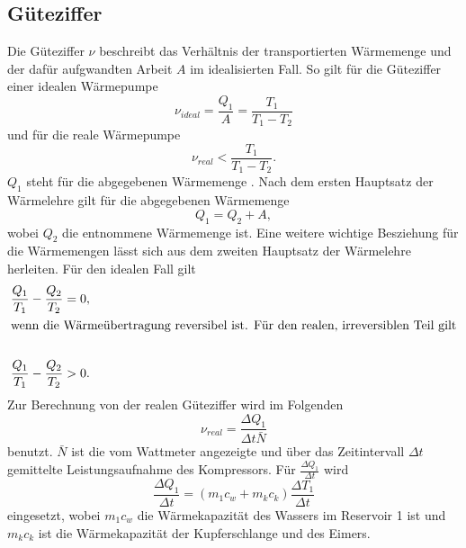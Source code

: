 \subsection{Güteziffer} %
\label{sub:Güteziffer}
Die Güteziffer $\nu$ beschreibt das Verhältnis der transportierten Wärmemenge und der dafür aufgwandten Arbeit $A$ im idealisierten Fall.
So gilt für die Güteziffer einer idealen Wärmepumpe
\begin{equation*}
    \nu_{ideal} = \frac{Q_1}{A} = \frac{T_1}{T_1 - T_2}
    \label{eqn:Güteziffer_ideal}
\end{equation*} 
und für die reale Wärmepumpe
\begin{equation*}
    \nu_{real} < \frac{T_1}{T_1 - T_2}.
\end{equation*}
$Q_1$ steht für die abgegebenen Wärmemenge . 
Nach dem ersten Hauptsatz der Wärmelehre gilt für die abgegebenen Wärmemenge
\begin{equation*}
    Q_1 = Q_2 + A ,
\end{equation*}
wobei $Q_2$  die entnommene Wärmemenge ist.
Eine weitere wichtige Besziehung für die Wärmemengen lässt sich aus dem zweiten Hauptsatz der Wärmelehre herleiten.
Für den idealen Fall gilt
\begin{align*}
    \frac{Q_1}{T_1}-\frac{Q_2}{T_2} = 0,\\
    \intertext{wenn die Wärmeübertragung reversibel ist. Für den realen, irreversiblen Teil gilt}\\
    \frac{Q_1}{T_1}-\frac{Q_2}{T_2} > 0.
\end{align*}
Zur Berechnung von der realen Güteziffer wird im Folgenden 
\begin{equation}
    \nu_{real} = \frac{\Delta Q_1}{\Delta t \bar{N}}
    \label{eqn:Güteziffer}
\end{equation}
benutzt. 
$\bar{N}$ ist die vom Wattmeter angezeigte und über das Zeitintervall $\Delta t$ gemittelte Leistungsaufnahme des Kompressors.
Für $\frac{\Delta Q_1}{\Delta t}$ wird
\begin{equation}
    \frac{\Delta Q_1}{\Delta t} = (m_1 c_w + m_k c_k)\frac{\Delta T_1}{\Delta t}
    \label{eqn:DeltaQ1}
\end{equation}
eingesetzt, wobei $m_1 c_w$ die Wärmekapazität des Wassers im Reservoir 1 ist und $m_k c_k$ ist die Wärmekapazität der Kupferschlange und des Eimers.
